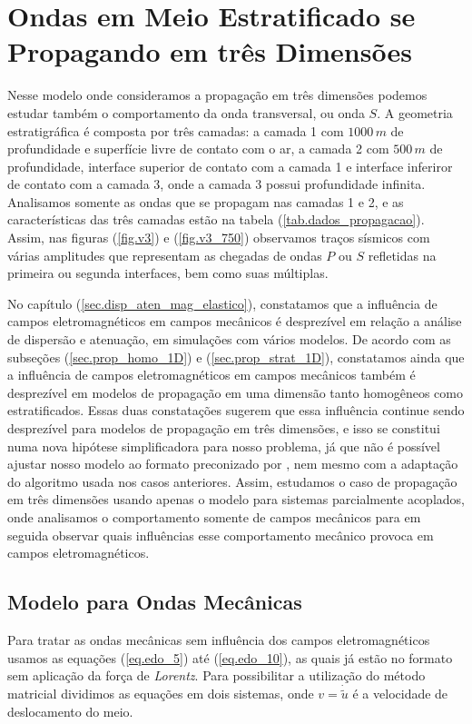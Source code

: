 \section{Ondas em Meio Estratificado se Propagando em tr\^es Dimens\~oes}
Nesse modelo onde consideramos a propaga\c{c}\~ao em tr\^es dimens\~oes podemos estudar tamb\'em o comportamento da onda transversal, ou onda $S$. A geometria estratigr\'afica \'e composta por tr\^es camadas: a camada 1 com $1000\,m$ de profundidade e superf\'icie livre de contato com o ar, a camada 2 com $500\,m$ de profundidade, interface superior de contato com a camada 1 e interface inferiror de contato com a camada 3, onde a camada 3 possui profundidade infinita. Analisamos somente as ondas que se propagam nas camadas 1 e 2, e as caracter\'isticas das tr\^es camadas est\~ao na tabela (\ref{tab.dados_propagacao}). Assim, nas figuras (\ref{fig.v3}) e (\ref{fig.v3_750}) observamos tra\c{c}os s\'ismicos com v\'arias amplitudes que representam as chegadas de ondas $P$ ou $S$ refletidas na primeira ou segunda interfaces, bem como suas m\'ultiplas.

No cap\'itulo (\ref{sec.disp_aten_mag_elastico}), constatamos que a influ\^encia de campos eletromagn\'eticos em campos mec\^anicos \'e desprez\'ivel em rela\c{c}\~ao a an\'alise de dispers\~ao e atenua\c{c}\~ao, em simula\c{c}\~oes com v\'arios modelos. De acordo com as subse\c{c}\~oes (\ref{sec.prop_homo_1D}) e (\ref{sec.prop_strat_1D}), constatamos ainda que a influ\^encia de campos eletromagn\'eticos em campos mec\^anicos tamb\'em \'e desprez\'ivel em modelos de propaga\c{c}\~ao em uma dimens\~ao tanto homog\^eneos como estratificados. Essas duas constata\c{c}\~oes sugerem que essa influ\^encia continue sendo desprez\'ivel para modelos de propaga\c{c}\~ao em tr\^es dimens\~oes, e isso se constitui numa nova hip\'otese simplificadora para nosso problema, j\'a que n\~ao \'e poss\'ivel ajustar nosso modelo ao formato preconizado por \cite{Ursin-1983}, nem mesmo com a adapta\c{c}\~ao do algoritmo usada nos casos anteriores. Assim, estudamos o caso de propaga\c{c}\~ao em tr\^es dimens\~oes usando apenas o modelo para sistemas parcialmente acoplados, onde analisamos o comportamento somente de campos mec\^anicos para em seguida observar quais influ\^encias esse comportamento mec\^anico provoca em campos eletromagn\'eticos.

\subsection{Modelo para Ondas Mec\^anicas}
Para tratar as ondas mec\^anicas sem influ\^encia dos campos eletromagn\'eticos usamos as equa\c{c}\~oes (\ref{eq.edo_5}) at\'e (\ref{eq.edo_10}), as quais j\'a est\~ao no formato sem aplica\c{c}\~ao da for\c{c}a de \textit{Lorentz}. Para possibilitar a utiliza\c{c}\~ao do m\'etodo matricial dividimos as equa\c{c}\~oes em dois sistemas, onde $v=\dot{\tilde{u}}$ \'e a velocidade de deslocamento do meio.


